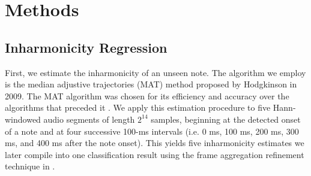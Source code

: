 \documentclass[convention,peer-reviewed]{aesconf}
\begin{document}
\section{Methods}

\subsection{Inharmonicity Regression}
\label{sub:inharmonicity-regression}
First, we estimate the inharmonicity of an unseen note. The algorithm we employ is the median adjustive trajectories (MAT) method \citep{hodgkinson2009} proposed by Hodgkinson in 2009. The MAT algorithm was chosen for its efficiency and accuracy over the algorithms that preceded it \citep{hodgkinson2009}. We apply this estimation procedure to five Hann-windowed audio segments of length $2^{14}$ samples, beginning at the detected onset of a note and at four successive 100-ms intervals (i.e. 0 ms, 100 ms, 200 ms, 300 ms, and 400 ms after the note onset). This yields five inharmonicity estimates we later compile into one classification result using the frame aggregation refinement technique in \citep{abesser2012}.
\end{document}
